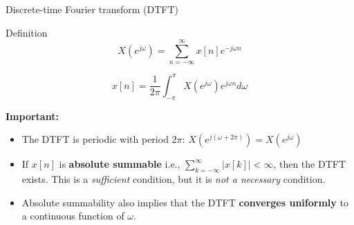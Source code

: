 \documentclass[10pt]{beamer}
\begin{document}
%
\begin{frame}{Discrete-time Fourier transform (DTFT)}

\begin{block}{Definition}
\begin{equation} \tag{Direct transform}
X(e^{j\omega}) = \sum_{n=-\infty}^{\infty} x[n]e^{-j\omega n} 
\end{equation}

\begin{equation}\tag{Inverse transform}
x[n] = \frac{1}{2\pi}\int_{-\pi}^{\pi}X(e^{j\omega})e^{j\omega n}d\omega
\end{equation}
\end{block}

\textbf{Important:}
\begin{itemize}
	\item The DTFT is periodic with period $2\pi$: $\displaystyle X(e^{j(\omega + 2\pi)}) = X(e^{j\omega})$
	\item If $x[n]$ is \textbf{absolute summable} i.e., $\sum_{k=-\infty}^{\infty} |x[k]| < \infty$, then the DTFT exists. This is a \textit{sufficient} condition, but it is \textit{not a necessary} condition.
	\item Absolute summability also implies that the DTFT \textbf{converges uniformly} to a continuous function of $\omega$.
\end{itemize}
\end{frame}
\end{document}
